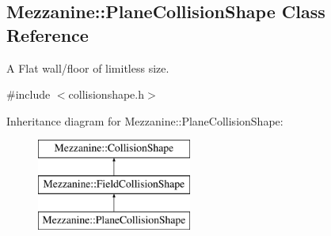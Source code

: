 \hypertarget{classMezzanine_1_1PlaneCollisionShape}{
\subsection{Mezzanine::PlaneCollisionShape Class Reference}
\label{classMezzanine_1_1PlaneCollisionShape}
}


A Flat wall/floor of limitless size.  




{\ttfamily \#include $<$collisionshape.h$>$}

Inheritance diagram for Mezzanine::PlaneCollisionShape:\begin{figure}[H]
\begin{center}
\leavevmode
\includegraphics[height=3.000000cm]{classMezzanine_1_1PlaneCollisionShape}
\end{center}
\end{figure}
